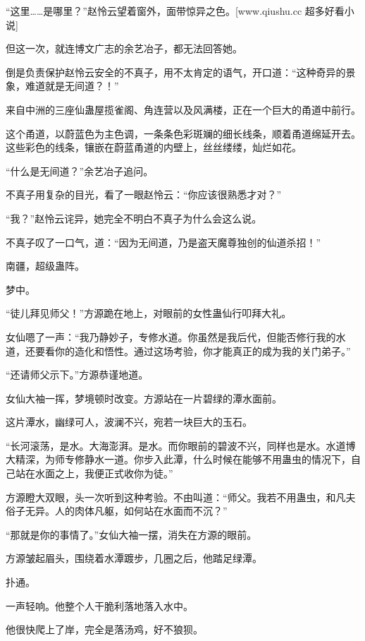 
\begin{this_body}

“这里……是哪里？”赵怜云望着窗外，面带惊异之色。[www.qiushu.cc 超多好看小说]

但这一次，就连博文广志的余艺冶子，都无法回答她。

倒是负责保护赵怜云安全的不真子，用不太肯定的语气，开口道：“这种奇异的景象，难道就是无间道？！”

来自中洲的三座仙蛊屋揽雀阁、角连营以及风满楼，正在一个巨大的甬道中前行。

这个甬道，以蔚蓝色为主色调，一条条色彩斑斓的细长线条，顺着甬道绵延开去。这些彩色的线条，镶嵌在蔚蓝甬道的内壁上，丝丝缕缕，灿烂如花。

“什么是无间道？”余艺冶子追问。

不真子用复杂的目光，看了一眼赵怜云：“你应该很熟悉才对？”

“我？”赵怜云诧异，她完全不明白不真子为什么会这么说。

不真子叹了一口气，道：“因为无间道，乃是盗天魔尊独创的仙道杀招！”

南疆，超级蛊阵。

梦中。

“徒儿拜见师父！”方源跪在地上，对眼前的女性蛊仙行叩拜大礼。

女仙嗯了一声：“我乃静妙子，专修水道。你虽然是我后代，但能否修行我的水道，还要看你的造化和悟性。通过这场考验，你才能真正的成为我的关门弟子。”

“还请师父示下。”方源恭谨地道。

女仙大袖一挥，梦境顿时改变。方源站在一片碧绿的潭水面前。

这片潭水，幽绿可人，波澜不兴，宛若一块巨大的玉石。

“长河滚荡，是水。大海澎湃。是水。而你眼前的碧波不兴，同样也是水。水道博大精深，为师专修静水一道。你步入此潭，什么时候在能够不用蛊虫的情况下，自己站在水面之上，我便正式收你为徒。”

方源瞪大双眼，头一次听到这种考验。不由叫道：“师父。我若不用蛊虫，和凡夫俗子无异。人的肉体凡躯，如何站在水面而不沉？”

“那就是你的事情了。”女仙大袖一摆，消失在方源的眼前。

方源皱起眉头，围绕着水潭踱步，几圈之后，他踏足绿潭。

扑通。

一声轻响。他整个人干脆利落地落入水中。

他很快爬上了岸，完全是落汤鸡，好不狼狈。


\end{this_body}
